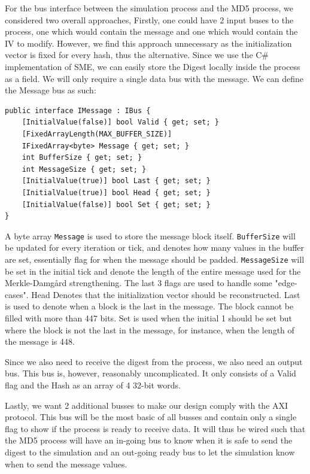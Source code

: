 \documentclass[a4paper, openany]{book}
\begin{document}
\begin{abstact}
For the bus interface between the simulation process and the MD5 process, we considered two overall approaches,
Firstly, one could have 2 input buses to the process, one which would contain the message and one which would contain the IV to modify. However, we find this approach unnecessary as the initialization vector is fixed for every hash, thus the alternative. Since we use the C\# implementation of SME, we can easily store the Digest locally inside the process as a field. We will only require a single data bus with the message. We can define the Message bus as such:
\begin{Verbatim}[fontsize=\footnotesize]
public interface IMessage : IBus {
    [InitialValue(false)] bool Valid { get; set; }
    [FixedArrayLength(MAX_BUFFER_SIZE)]
    IFixedArray<byte> Message { get; set; }
    int BufferSize { get; set; }
    int MessageSize { get; set; }
    [InitialValue(true)] bool Last { get; set; }
    [InitialValue(true)] bool Head { get; set; }
    [InitialValue(false)] bool Set { get; set; }
}
\end{Verbatim}
A byte array \texttt{Message} is used to store the message block itself. \texttt{BufferSize} will be updated for every iteration or tick, and denotes how many values in the buffer are set, essentially flag for when the message should be padded. \texttt{MessageSize} will be set in the initial tick and denote the length of the entire message used for the Merkle-Damgård strengthening.
The last 3 flags are used to handle some "edge-cases".
Head Denotes that the initialization vector should be reconstructed.
Last is used to denote when a block is the last in the message. The block cannot be filled with more than 447 bits.
Set is used when the initial 1 should be set but where the block is not the last in the message, for instance, when the length of the message is 448.

Since we also need to receive the digest from the process, we also need an output bus. This bus is, however, reasonably uncomplicated. It only consists of a Valid flag and the Hash as an array of 4 32-bit words.

Lastly, we want 2 additional busses to make our design comply with the AXI protocol. This bus will be the most basic of all busses and contain only a single flag to show if the process is ready to receive data. It will thus be wired such that the MD5 process will have an in-going bus to know when it is safe to send the digest to the simulation and an out-going ready bus to let the simulation know when to send the message values.


\end{abstact}
\end{document}
